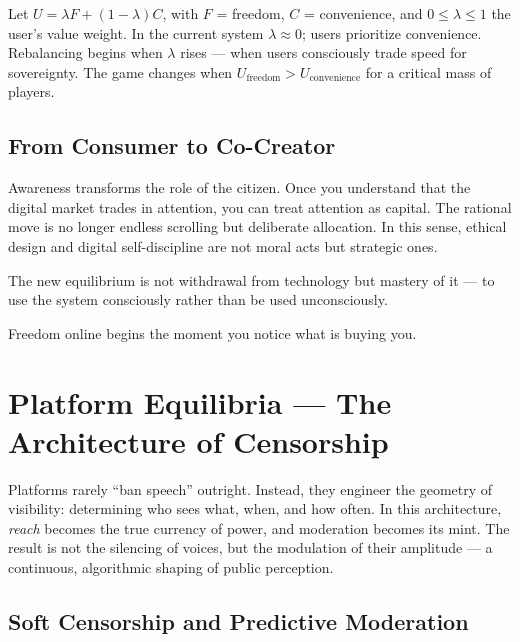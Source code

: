 \documentclass[12pt,twoside]{book}
\begin{document}
\begin{tcolorbox}[colback=gray!5,colframe=gray!60,boxrule=0.4pt,arc=1mm,
title={Mathematical Interlude: Freedom–Convenience Trade-off}]
Let $U = \lambda F + (1-\lambda)C$, with $F$ = freedom, $C$ = convenience, and $0\le\lambda\le1$ the user’s value weight.  
In the current system $\lambda\approx0$; users prioritize convenience.  
Rebalancing begins when $\lambda$ rises --- when users consciously trade speed for sovereignty.  
The game changes when $U_{\text{freedom}}>U_{\text{convenience}}$ for a critical mass of players.
\end{tcolorbox}

\section{From Consumer to Co-Creator}

Awareness transforms the role of the citizen.  
Once you understand that the digital market trades in attention, you can treat attention as capital.  
The rational move is no longer endless scrolling but deliberate allocation.  
In this sense, ethical design and digital self-discipline are not moral acts but strategic ones.  

The new equilibrium is not withdrawal from technology but mastery of it --- to use the system consciously rather than be used unconsciously. \\

\begin{keyidea}
Freedom online begins the moment you notice what is buying you.
\end{keyidea}

\chapter{Platform Equilibria — The Architecture of Censorship}

Platforms rarely “ban speech” outright.  
Instead, they engineer the geometry of visibility: determining who sees what, when, and how often.  
In this architecture, \emph{reach} becomes the true currency of power, and moderation becomes its mint.  
The result is not the silencing of voices, but the modulation of their amplitude --- a continuous, algorithmic shaping of public perception.

\section{Soft Censorship and Predictive Moderation}
\end{document}

